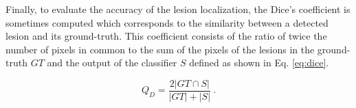 Finally, to evaluate the accuracy of the lesion localization, the Dice's coefficient is sometimes computed which corresponds to the similarity between a detected lesion and its ground-truth. This coefficient consists of the ratio of twice the number of pixels in common to the sum of the pixels of the lesions in the ground-truth $GT$ and the output of the classifier $S$ defined as shown in Eq. \eqref{eq:dice}.

\begin{equation}
  Q_D = \frac{2 | GT \cap S |}{| GT | + | S |} \ .
  \label{eq:dice}
\end{equation}

